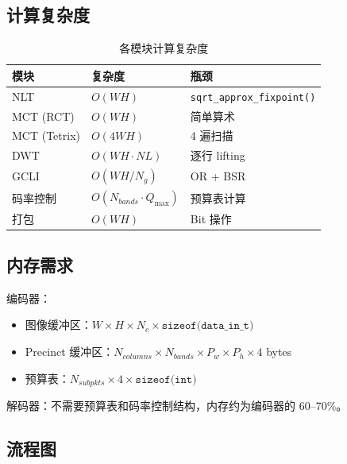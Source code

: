 \subsection{计算复杂度}

\begin{table}[H]
\centering
\caption{各模块计算复杂度}
\begin{tabular}{@{}lll@{}}
\toprule
模块 & 复杂度 & 瓶颈 \\
\midrule
NLT & $O(WH)$ & \texttt{sqrt\_approx\_fixpoint()} \\
MCT (RCT) & $O(WH)$ & 简单算术 \\
MCT (Tetrix) & $O(4WH)$ & 4 遍扫描 \\
DWT & $O(WH \cdot NL)$ & 逐行 lifting \\
GCLI & $O(WH / N_g)$ & OR + BSR \\
码率控制 & $O(N_{\mathit{bands}} \cdot Q_{\max})$ & 预算表计算 \\
打包 & $O(WH)$ & Bit 操作 \\
\bottomrule
\end{tabular}
\end{table}

\subsection{内存需求}

编码器：
\begin{itemize}
  \item 图像缓冲区：$W \times H \times N_c \times \texttt{sizeof(data\_in\_t)}$
  \item Precinct 缓冲区：$N_{\mathit{columns}} \times N_{\mathit{bands}} \times P_w \times P_h \times 4$ bytes
  \item 预算表：$N_{\mathit{subpkts}} \times 4 \times \texttt{sizeof(int)}$
\end{itemize}

解码器：不需要预算表和码率控制结构，内存约为编码器的 60--70\%。

\subsection{流程图}

